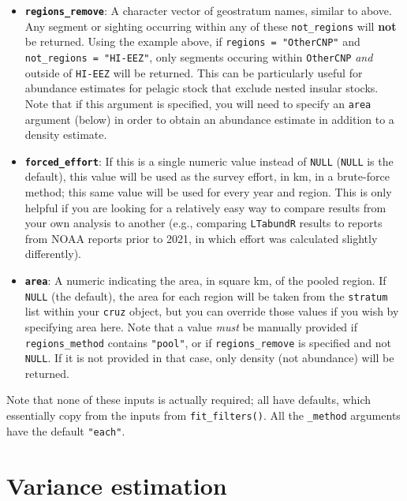 \documentclass[
]{book}
\begin{document}
\begin{itemize}
\item
  \textbf{\texttt{regions\_remove}}: A character vector of geostratum names, similar to above. Any segment or sighting occurring within any of these \texttt{not\_regions} will \textbf{not} be returned. Using the example above, if \texttt{regions\ =\ "OtherCNP"} and \texttt{not\_regions\ =\ "HI-EEZ"}, only segments occuring within \texttt{OtherCNP} \emph{and} outside of \texttt{HI-EEZ} will be returned. This can be particularly useful for abundance estimates for pelagic stock that exclude nested insular stocks. Note that if this argument is specified, you will need to specify an \texttt{area} argument (below) in order to obtain an abundance estimate in addition to a density estimate.
\item
  \textbf{\texttt{forced\_effort}}: If this is a single numeric value instead of \texttt{NULL} (\texttt{NULL} is the default), this value will be used as the survey effort, in km, in a brute-force method; this same value will be used for every year and region. This is only helpful if you are looking for a relatively easy way to compare results from your own analysis to another (e.g., comparing \texttt{LTabundR} results to reports from NOAA reports prior to 2021, in which effort was calculated slightly differently).
\item
  \textbf{\texttt{area}}: A numeric indicating the area, in square km, of the pooled region. If \texttt{NULL} (the default), the area for each region will be taken from the \texttt{stratum} list within your \texttt{cruz} object, but you can override those values if you wish by specifying area here. Note that a value \emph{must} be manually provided if \texttt{regions\_method} contains \texttt{"pool"}, or if \texttt{regions\_remove} is specified and not \texttt{NULL}. If it is not provided in that case, only density (not abundance) will be returned.
\end{itemize}

Note that none of these inputs is actually required; all have defaults, which essentially copy from the inputs from \texttt{fit\_filters()}. All the \texttt{\_method} arguments have the default \texttt{"each"}.

\hypertarget{variance-estimation}{%
\section*{Variance estimation}\label{variance-estimation}}
\end{document}
